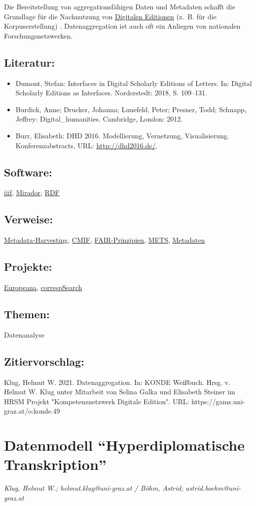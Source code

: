 \documentclass{article}
\begin{document}
        Die Bereitstellung von aggregationsfähigen Daten und Metadaten schafft die Grundlage für die Nachnutzung von \href{http://gams.uni-graz.at/o:konde.59}{Digitalen Editionen} (z. B. für die Korpuserstellung) . Datenaggregation ist auch oft ein Anliegen von nationalen Forschungsnetzwerken. \\
            
        \subsection*{Literatur:}\begin{itemize}\item Dumont, Stefan: Interfaces in Digital Scholarly Editions of Letters. In: Digital Scholarly Editions as Interfaces. Norderstedt: 2018, S. 109–131.\item Burdick, Anne; Drucker, Johanna; Lunefeld, Peter; Presner, Todd; Schnapp, Jeffrey: Digital_humanities. Cambridge, London: 2012.\item Burr, Elisabeth: DHD 2016. Modellierung, Vernetzung, Visualisierung. Konferenzabstracts, URL: \url{http://dhd2016.de/}.\end{itemize}\subsection*{Software:}\href{https://iiif.io/}{iiif}, \href{http://projectmirador.org/}{Mirador}, \href{https://www.w3.org/RDF/}{RDF}\subsection*{Verweise:}\href{https://gams.uni-graz.at/o:konde.10}{Metadata-Harvesting}, \href{https://gams.uni-graz.at/o:konde.42}{CMIF}, \href{https://gams.uni-graz.at/o:konde.7}{FAIR-Prinzipien}, \href{https://gams.uni-graz.at/o:konde.129}{METS}, \href{https://gams.uni-graz.at/o:konde.225}{Metadaten}\subsection*{Projekte:}\href{https://www.europeana.eu/portal/de}{Europeana}, \href{https://correspsearch.net}{correspSearch}\subsection*{Themen:}Datenanalyse\subsection*{Zitiervorschlag:}Klug, Helmut W. 2021. Datenaggregation. In: KONDE Weißbuch. Hrsg. v. Helmut W. Klug unter Mitarbeit von Selina Galka und Elisabeth Steiner im HRSM Projekt "Kompetenznetzwerk Digitale Edition". URL: https://gams.uni-graz.at/o:konde.49\newpage\section*{Datenmodell “Hyperdiplomatische Transkription”} \emph{Klug, Helmut W.; helmut.klug@uni-graz.at / Böhm, Astrid;
                  astrid.boehm@uni-graz.at }\\
        
\end{document}
